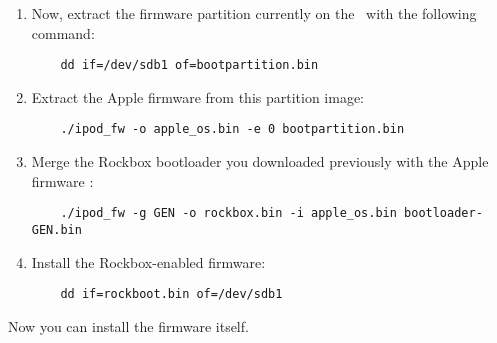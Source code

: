 \begin{enumerate}
  \item Now, extract the firmware partition currently on the \dap\ with the
    following command:
    \begin{verbatim}
    dd if=/dev/sdb1 of=bootpartition.bin
    \end{verbatim}
  \item Extract the Apple firmware from this partition image:
    \begin{verbatim}
    ./ipod_fw -o apple_os.bin -e 0 bootpartition.bin
    \end{verbatim}

  \item Merge the Rockbox bootloader you downloaded previously with the Apple
    firmware :
    \begin{verbatim}
    ./ipod_fw -g GEN -o rockbox.bin -i apple_os.bin bootloader-GEN.bin
    \end{verbatim}
  \item
    Install the Rockbox-enabled firmware:
    \begin{verbatim}
    dd if=rockboot.bin of=/dev/sdb1
    \end{verbatim}
\end{enumerate}
Now you can install the firmware itself.

